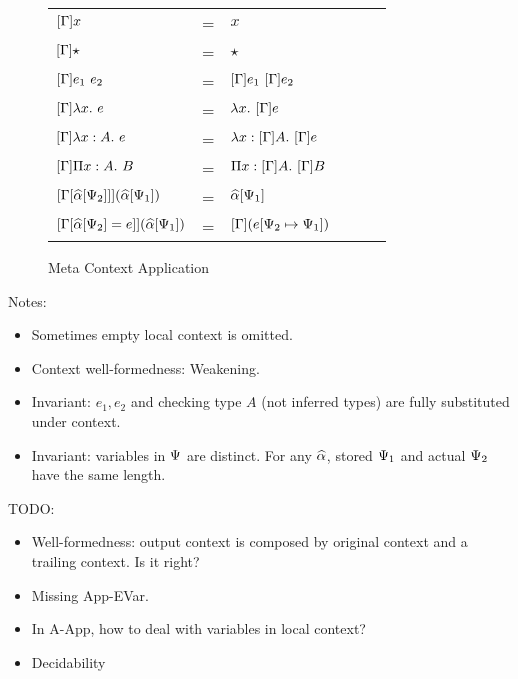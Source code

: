 \begin{figure}[t]
    \begin{tabular}{llp{3cm}lll}
        $[{\Gamma}] x $ & = & $x$ \\
        $[{\Gamma}] \star $ & = & $\star$ \\
        $[{\Gamma}] e_1 ~ e_2 $ & = & ${[{\Gamma}] e_1} ~ {[{\Gamma}] e_2}$ \\
        $[{\Gamma}] \lambda {x}.~ e $ & = & $\lambda {x}.~ {[{\Gamma}] e}$ \\
        $[{\Gamma}] \lambda x:A.~ e $ & = & $\lambda x:[{\Gamma}] A.~ {[{\Gamma}] e}$ \\
        $[{\Gamma}] \Pi x:A.~ B $ & = & $\Pi x:[{\Gamma}] A.~ {[{\Gamma}] B}$ \\
        $[{\Gamma[\widehat{\alpha}[\Psi_2]]}] (\widehat{\alpha}[\Psi_1]) $ & = & $\widehat{\alpha}[\Psi_1] $ \\
        $[{\Gamma[\widehat{\alpha}[\Psi_2] = e]}] (\widehat{\alpha}[\Psi_1]) $ & = & $[{\Gamma}] (e [\Psi_2 \mapsto \Psi_1]) $ \\
    \end{tabular}
    \caption{Meta Context Application}
    \label{figure:erasure}
\end{figure}


Notes:
\begin{itemize}
  \item Sometimes empty local context is omitted.
  \item Context well-formedness: Weakening.
  \item Invariant: $e_1, e_2$ and checking type $A$ (not inferred types) are
    fully substituted under context.
    \item Invariant: variables in $\Psi$ are distinct. For any $\widehat{\alpha}$, stored
      $\Psi_1$ and actual $\Psi_2$ have the same length.
\end{itemize}

TODO:
\begin{itemize}
  \item Well-formedness: output context is composed by original context and a
    trailing context. Is it right?
  \item Missing App-EVar.
  \item In A-App, how to deal with variables in local context?
  \item Decidability
\end{itemize}

